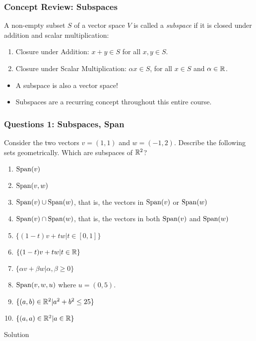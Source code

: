 \documentclass{beamer}
\begin{document}
\begin{frame}[t]
	\frametitle{Concept Review: Subspaces}
	\begin{definition}[Subspace]
		A non-empty subset $S$ of a vector space $V$ is called a \emph{subspace} if it is closed under addition and scalar multiplication:
		\begin{enumerate}
			\item Closure under Addition: $x+y \in S$  for all $x,y \in S$.
			\item Closure under Scalar Multiplication: $\alpha x \in S$, for all $x \in S$ and $\alpha \in \mathbb{R}$.
		\end{enumerate}
	\end{definition}
	\begin{itemize}
		\item A subspace is also a vector space!
		\item Subspaces are a recurring concept throughout this entire course.
	\end{itemize}
\end{frame}

\begin{frame}
	\frametitle{Questions 1: Subspaces, Span}
	Consider the two vectors $v=(1,1)$ and
	$w=(-1,2)$.  Describe the following sets geometrically.  Which are
	subspaces of $\mathbb{R}^2$?
	\begin{enumerate}
		\item ${{\rm Span}}(v)$
		\item ${{\rm Span}}(v,w)$
		\item ${{\rm Span}}(v)\cup{{\rm Span}}(w)$, that is, the vectors in ${{\rm Span}}(v)$ or
			${{\rm Span}}(w)$
		\item ${{\rm Span}}(v)\cap{{\rm Span}}(w)$, that is, the vectors in both ${{\rm Span}}(v)$ and
			${{\rm Span}}(w)$
			\pause
		\item $\{(1-t)v + tw | t\in[0,1]\}$
		\item $\{(1-t)v+tw | t\in\mathbb{R}\}$
		\item $\{\alpha v + \beta w | \alpha,\beta\geq 0\}$
		\item ${{\rm Span}}(v,w,u)$ where $u=(0,5)$.
		\item $\{(a,b)\in\mathbb{R}^2 | a^2+b^2\leq 25\}$
		\item $\{(a,a)\in\mathbb{R}^2 | a\in\mathbb{R}\}$
	\end{enumerate}
\end{frame}

\begin{frame}[t]{Solution}
	\grid
	\pause
	\pause
	\pause
\end{frame}
\end{document}
